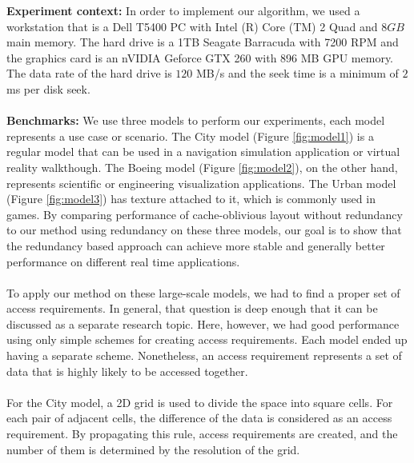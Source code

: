\textbf{Experiment context:}
In order to implement our algorithm, we used a workstation that is a Dell T5400 PC with Intel (R) Core (TM) 2 Quad and $8GB$ main memory. The hard drive is a 1TB Seagate Barracuda with 7200 RPM and the graphics card is an nVIDIA Geforce GTX 260 with 896 MB GPU memory. The data rate of the hard drive is $120$ MB/s and the seek time is a minimum of $2$ ms per disk seek.\\
\\
\textbf{Benchmarks:}
We use three models to perform our experiments, each model represents a use
case or scenario. The City model (Figure \ref{fig:model1}) is a regular model
that can be used in a navigation simulation application or virtual reality
walkthough. The Boeing model (Figure \ref{fig:model2}), on the other hand,
represents scientific or engineering visualization applications. The Urban
model (Figure \ref{fig:model3}) has texture attached to it, which is commonly
used in games. By comparing performance of cache-oblivious layout without
redundancy~\cite{cacheobliviouslayout} to our method using redundancy on these three models, our goal
is to show that the redundancy based approach can achieve more stable and generally
better performance on different real time applications. \\
\\ To apply our method on these large-scale models, we had to find a proper set
of access requirements. In general, that question is deep enough that it can be
discussed as a separate research topic. Here, however, we had good performance
using only simple schemes for creating access requirements. Each model ended up
having a separate scheme. Nonetheless, an access requirement represents a set
of data that is highly likely to be accessed together. \\
\\
For the City model, a 2D grid is used to divide the space into square cells. For each pair of adjacent cells, the difference of the data is considered as an access requirement. By propagating this rule, access requirements are created, and the number of them is determined by the resolution of the grid.  \\
\\
